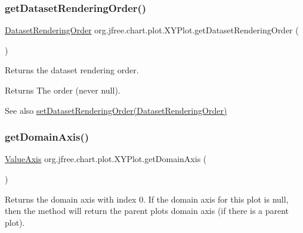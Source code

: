 \subsubsection{\texorpdfstring{get\+Dataset\+Rendering\+Order()}{getDatasetRenderingOrder()}}
{\footnotesize\ttfamily \mbox{\hyperlink{classorg_1_1jfree_1_1chart_1_1plot_1_1_dataset_rendering_order}{Dataset\+Rendering\+Order}} org.\+jfree.\+chart.\+plot.\+X\+Y\+Plot.\+get\+Dataset\+Rendering\+Order (\begin{DoxyParamCaption}{ }\end{DoxyParamCaption})}

Returns the dataset rendering order.

\begin{DoxyReturn}{Returns}
The order (never {\ttfamily null}).
\end{DoxyReturn}
\begin{DoxySeeAlso}{See also}
\mbox{\hyperlink{classorg_1_1jfree_1_1chart_1_1plot_1_1_x_y_plot_ae1789cf50a68e21074c57a0bdc79c6c6}{set\+Dataset\+Rendering\+Order(\+Dataset\+Rendering\+Order)}} 
\end{DoxySeeAlso}
\mbox{\label{classorg_1_1jfree_1_1chart_1_1plot_1_1_x_y_plot_a2c5e698142aa9597e1aa2d73bec69451}} 
\subsubsection{\texorpdfstring{get\+Domain\+Axis()}{getDomainAxis()}\hspace{0.1cm}{\footnotesize\ttfamily [1/2]}}
{\footnotesize\ttfamily \mbox{\hyperlink{classorg_1_1jfree_1_1chart_1_1axis_1_1_value_axis}{Value\+Axis}} org.\+jfree.\+chart.\+plot.\+X\+Y\+Plot.\+get\+Domain\+Axis (\begin{DoxyParamCaption}{ }\end{DoxyParamCaption})}

Returns the domain axis with index 0. If the domain axis for this plot is {\ttfamily null}, then the method will return the parent plot\textquotesingle{}s domain axis (if there is a parent plot).

